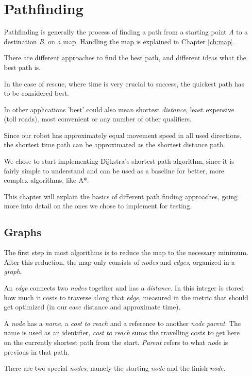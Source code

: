 \chapter{Pathfinding}\label{ch:path}
Pathfinding is generally the process of finding a path from a starting point \emph{A}
to a destination \emph{B},
on a map.
Handling the map is explained in Chapter \ref{ch:map}.

There are different approaches to find the best path,
and different ideas what the best path is.

In the case of rescue, where time is very crucial to success,
the quickest path has to be considered best. \cite{Zipes2506}

In other applications 'best' could also mean shortest \emph{distance}, least expensive (toll roads),
most convenient or any number of other qualifiers.

Since our robot has approximately equal movement speed in all used directions,
the shortest time path can be approximated as the shortest distance path.

We chose to start implementing Dijkstra's shortest path algorithm,
since it is fairly simple to understand and can be used as a baseline for better,
more complex algorithms, like A*.

This chapter will explain the basics of different path finding approaches,
going more into detail on the ones we chose to implement for testing.

\section{Graphs}
The first step in most algorithms is to reduce the map to the necessary minimum.
After this reduction, the map only consists of \emph{nodes} and \emph{edges},
organized in a \emph{graph}.

An \emph{edge} connects two \emph{nodes} together and has a \emph{distance}.
In this integer is stored how much it costs to traverse along that \emph{edge},
measured in the metric that should get optimized (in our case distance and approximate time).

A \emph{node} has a \emph{name}, a \emph{cost to reach} and a reference to another \emph{node} \emph{parent}.
The name is used as an identifier,
\emph{cost to reach} sums the travelling costs to get here on the currently shortest path from the start.
\emph{Parent} refers to what \emph{node} is previous in that path.

There are two special \emph{nodes}, namely the starting \emph{node} and the finish \emph{node}.


